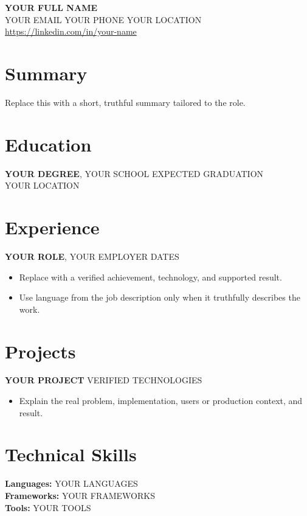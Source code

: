 \documentclass[letterpaper,11pt]{article}
\newcommand{\CandidateName}{YOUR FULL NAME}
\newcommand{\CandidateEmail}{YOUR EMAIL}
\newcommand{\CandidatePhone}{YOUR PHONE}
\newcommand{\CandidateLocation}{YOUR LOCATION}
\newcommand{\CandidateLinkedIn}{https://linkedin.com/in/your-name}
\begin{document}
\begin{center}
  {\Huge \textbf{\CandidateName}}\\
  \vspace{2pt}
  \CandidateEmail{} \textbar{} \CandidatePhone{} \textbar{} \CandidateLocation\\
  \href{\CandidateLinkedIn}{\CandidateLinkedIn}
\end{center}

\section{Summary}
Replace this with a short, truthful summary tailored to the role.

\section{Education}
\textbf{YOUR DEGREE}, YOUR SCHOOL \hfill EXPECTED GRADUATION\\
YOUR LOCATION

\section{Experience}
\textbf{YOUR ROLE}, YOUR EMPLOYER \hfill DATES
\begin{itemize}
  \item Replace with a verified achievement, technology, and supported result.
  \item Use language from the job description only when it truthfully describes the work.
\end{itemize}

\section{Projects}
\textbf{YOUR PROJECT} \hfill VERIFIED TECHNOLOGIES
\begin{itemize}
  \item Explain the real problem, implementation, users or production context, and result.
\end{itemize}

\section{Technical Skills}
\textbf{Languages:} YOUR LANGUAGES\\
\textbf{Frameworks:} YOUR FRAMEWORKS\\
\textbf{Tools:} YOUR TOOLS
\end{document}
